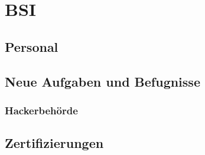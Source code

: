 \chapter{BSI}\label{ch:bsi}

\section{Personal}\label{sec:personal}

\section{Neue Aufgaben und Befugnisse}\label{sec:neue-aufgaben-und-befugnisse}

\subsection{Hackerbehörde}\label{ssec:hackerbehorde}

\section{Zertifizierungen}\label{sec:zertifizierungen}
